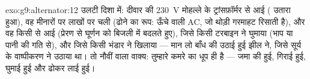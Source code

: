 \begin{solution}{exo:g9:alternator:12}
उलटी दिशा में: दीवार की \qty{230}{V} मोहल्ले के ट्रांसफ़ॉर्मर से आई
( उतारा हुआ), वह मीनारों पर लाखों  पर चली (ढोने का रूप:
ऊँचे  वाली AC, जो थोड़ी गरमाहट रिसाती है), और वह किसी
 से आई (प्रेरण से घूर्णन को बिजली में बदलते हुए), जिसे
किसी टरबाइन ने घुमाया (भाप या पानी की गति से), और जिसे किसी भंडार ने
खिलाया --- मान लो बाँध की उठाई हुई झील ने, जिसे सूर्य के वाष्पीकरण ने
उठाया था। तो नौवीं  वाला वाक्य: तुम्हारे कमरे का  धूप ही है
--- जमा की हुई, गिराई हुई, घुमाई हुई और ढोकर लाई हुई।
\end{solution}


